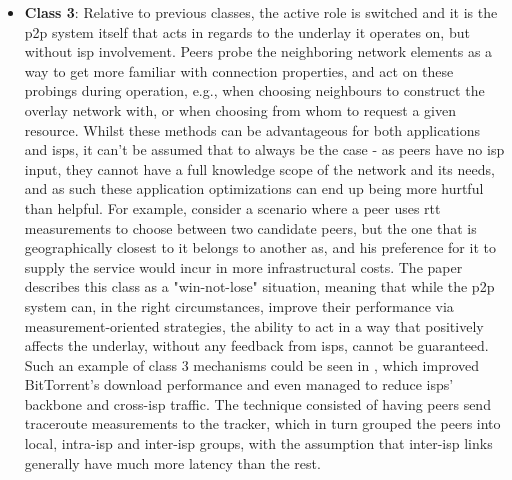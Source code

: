 \begin{itemize}
            Perhaps worse, even when considering proper budget and maintenance, such methods can prove themselves to be not possible at all - for legal reasons, as data caches could possibly contain illegal content; and for technical reasons, since the packet inspection required by \glspl{isp} to detect and steer \gls{p2p} traffic may be blocked due to the peer's attempts to mask its traffic.
            It's also important to note that since no application-layer input exists, this approach could be one-sided in the sense that only \gls{isp} needs are favored without directly considering application needs.

        \item \textbf{Class 3}:
            Relative to previous classes, the active role is switched and it is the \gls{p2p} system itself that acts in regards to the underlay it operates on, but without \gls{isp} involvement.
            Peers probe the neighboring network elements as a way to get more familiar with connection properties, and act on these probings during operation, e.g., when choosing neighbours to construct the overlay network with, or when choosing from whom to request a given resource.
            Whilst these methods can be advantageous for both applications and \glspl{isp}, it can't be assumed that to always be the case - as peers have no \gls{isp} input, they cannot have a full knowledge scope of the network and its needs, and as such these application optimizations can end up being more hurtful than helpful.
            For example, consider a scenario where a peer uses \gls{rtt} measurements to choose between two candidate peers, but the one that is geographically closest to it belongs to another \gls{as}, and his preference for it to supply the service would incur in more infrastructural costs.
            The paper describes this class as a "win-not-lose" situation, meaning that while the \gls{p2p} system can, in the right circumstances, improve their performance via measurement-oriented strategies, the ability to act in a way that positively affects the underlay, without any feedback from \glspl{isp}, cannot be guaranteed.
            Such an example of class 3 mechanisms could be seen in \cite{qin2009}, which improved BitTorrent's download performance and even managed to reduce \glspl{isp}' backbone and cross-\gls{isp} traffic.
            The technique consisted of having peers send traceroute measurements to the tracker, which in turn grouped the peers into local, intra-\gls{isp} and inter-\gls{isp} groups, with the assumption that inter-\gls{isp} links generally have much more latency than the rest.

\end{itemize}
